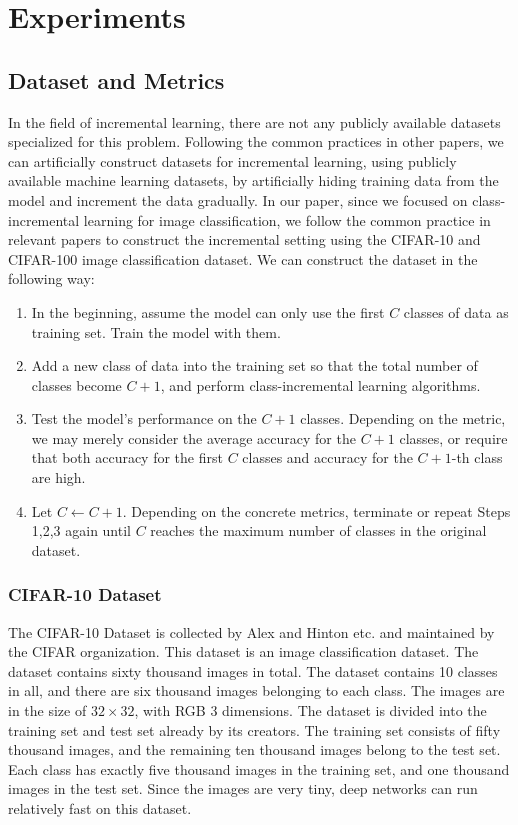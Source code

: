 \chapter{Experiments}
\section{Dataset and Metrics}
In the field of incremental learning, there are not any publicly available datasets specialized for this problem. Following the common practices in other papers, we can artificially construct datasets for incremental learning, using publicly available machine learning datasets, by artificially hiding training data from the model and increment the data gradually. In our paper, since we focused on class-incremental learning for image classification, we follow the common practice in relevant papers to construct the incremental setting using the CIFAR-10 and CIFAR-100 image classification dataset. We can construct the dataset in the following way:
\begin{enumerate}
	\item In the beginning, assume the model can only use the first $C$ classes of data as training set. Train the model with them.
	\item Add a new class of data into the training set so that the total number of classes become $C+1$, and perform class-incremental learning algorithms. 
	\item Test the model's performance on the $C+1$ classes. Depending on the metric, we may merely consider the average accuracy for the $C+1$ classes, or require that both accuracy for the first $C$ classes and accuracy for the $C+1$-th class are high.
	\item Let $C \gets C+1$. Depending on the concrete metrics, terminate or repeat Steps 1,2,3 again until $C$ reaches the maximum number of classes in the original dataset.
\end{enumerate}



\subsection{CIFAR-10 Dataset}

The CIFAR-10 Dataset is collected by Alex and Hinton etc.\cite{krizhevsky2009learning} and maintained by the CIFAR organization. This dataset is an image classification dataset. The dataset contains sixty thousand images in total. The dataset contains 10 classes in all, and there are six thousand images belonging to each class. The images are in the size of $32 \times 32$, with RGB 3 dimensions. The dataset is divided into the training set and test set already by its creators. The training set consists of fifty thousand images, and the remaining ten thousand images belong to the test set. Each class has exactly five thousand images in the training set, and one thousand images in the test set. Since the images are very tiny, deep networks can run relatively fast on this dataset.

